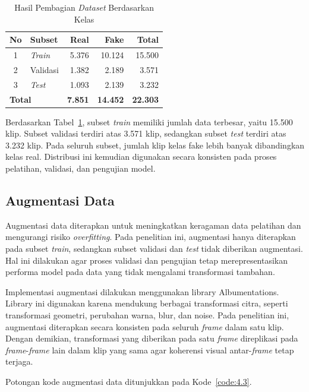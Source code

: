\begin{table}[htbp]
	\centering
	\caption{Hasil Pembagian \textit{Dataset} Berdasarkan Kelas}
	\label{table:4.split}
	\begin{tabular}{clrrr}
		\toprule
		\textbf{No} & \textbf{Subset} & \textbf{Real} & \textbf{Fake} & \textbf{Total} \\
		\midrule
		1 & \textit{Train} & 5.376 & 10.124 & 15.500 \\
		2 & Validasi & 1.382 & 2.189 & 3.571 \\
		3 & \textit{Test} & 1.093 & 2.139 & 3.232 \\
		\midrule
		\multicolumn{2}{l}{\textbf{Total}} & \textbf{7.851} & \textbf{14.452} & \textbf{22.303} \\
		\bottomrule
	\end{tabular}
\end{table}

Berdasarkan Tabel~\ref{table:4.split}, subset \textit{train} memiliki jumlah data terbesar, yaitu 15.500 klip. Subset validasi terdiri atas 3.571 klip, sedangkan subset \textit{test} terdiri atas 3.232 klip. Pada seluruh subset, jumlah klip kelas fake lebih banyak dibandingkan kelas real. Distribusi ini kemudian digunakan secara konsisten pada proses pelatihan, validasi, dan pengujian model.

\subsection{Augmentasi Data} \label{IV.Augmentasi}
Augmentasi data diterapkan untuk meningkatkan keragaman data pelatihan dan mengurangi risiko \textit{overfitting}. Pada penelitian ini, augmentasi hanya diterapkan pada subset \textit{train}, sedangkan subset validasi dan \textit{test} tidak diberikan augmentasi. Hal ini dilakukan agar proses validasi dan pengujian tetap merepresentasikan performa model pada data yang tidak mengalami transformasi tambahan.

Implementasi augmentasi dilakukan menggunakan library Albumentations. Library ini digunakan karena mendukung berbagai transformasi citra, seperti transformasi geometri, perubahan warna, blur, dan noise. Pada penelitian ini, augmentasi diterapkan secara konsisten pada seluruh \textit{frame} dalam satu klip. Dengan demikian, transformasi yang diberikan pada satu \textit{frame} direplikasi pada \textit{frame}-\textit{frame} lain dalam klip yang sama agar koherensi visual antar-\textit{frame} tetap terjaga.

Potongan kode augmentasi data ditunjukkan pada Kode~\ref{code:4.3}.


